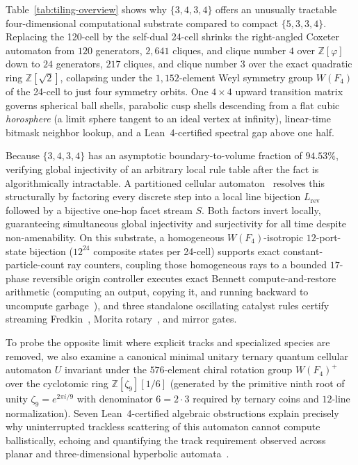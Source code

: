 Table~\ref{tab:tiling-overview} shows why $\{3,4,3,4\}$ offers an unusually tractable four-dimensional computational substrate compared to compact $\{5,3,3,4\}$. Replacing the 120-cell by the self-dual 24-cell shrinks the right-angled Coxeter automaton from $120$ generators, $2{,}641$ cliques, and clique number $4$ over $\mathbb{Z}[\varphi]$ down to $24$ generators, $217$ cliques, and clique number $3$ over the exact quadratic ring $\mathbb{Z}[\sqrt{2}]$, collapsing under the $1{,}152$-element Weyl symmetry group $W(F_4)$ of the 24-cell to just four symmetry orbits. One $4 \times 4$ upward transition matrix governs spherical ball shells, parabolic cusp shells descending from a flat cubic \emph{horosphere} (a limit sphere tangent to an ideal vertex at infinity), linear-time bitmask neighbor lookup, and a Lean~4-certified spectral gap above one half.

Because $\{3,4,3,4\}$ has an asymptotic boundary-to-volume fraction of $94.53\%$, verifying global injectivity of an arbitrary local rule table after the fact is algorithmically intractable. A partitioned cellular automaton~\cite{margolus1984,morita2017book} resolves this structurally by factoring every discrete step into a local line bijection $L_{\mathrm{rev}}$ followed by a bijective one-hop facet stream $S$. Both factors invert locally, guaranteeing simultaneous global injectivity and surjectivity for all time despite non-amenability. On this substrate, a homogeneous $W(F_4)$-isotropic $12$-port-state bijection ($12^{24}$ composite states per 24-cell) supports exact constant-particle-count ray counters, coupling those homogeneous rays to a bounded $17$-phase reversible origin controller executes exact Bennett compute-and-restore arithmetic (computing an output, copying it, and running backward to uncompute garbage~\cite{bennett1973}), and three standalone oscillating catalyst rules certify streaming Fredkin~\cite{fredkin1982}, Morita rotary~\cite{morita2001}, and mirror gates.

To probe the opposite limit where explicit tracks and specialized species are removed, we also examine a canonical minimal unitary ternary quantum cellular automaton $U$ invariant under the $576$-element chiral rotation group $W(F_4)^+$ over the cyclotomic ring $\mathbb{Z}[\zeta_9][1/6]$ (generated by the primitive ninth root of unity $\zeta_9 = e^{2\pi i/9}$ with denominator $6 = 2 \cdot 3$ required by ternary coins and $12$-line normalization). Seven Lean~4-certified algebraic obstructions explain precisely why uninterrupted trackless scattering of this automaton cannot compute ballistically, echoing and quantifying the track requirement observed across planar and three-dimensional hyperbolic automata~\cite{margenstern2021outer,margenstern2023weighted}.

